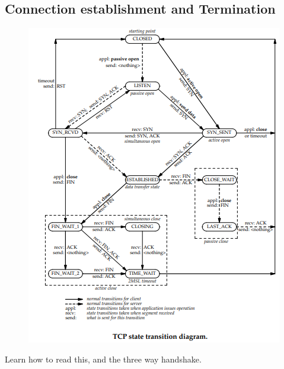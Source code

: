 \documentclass[12pt]{book}
\begin{document}
\subsection{Connection establishment and Termination}
\begin{figure}[H]
    \centering
    \includegraphics[width = \textwidth]{Pictures/TCP.png}
\end{figure}
Learn how to read this, and the three way handshake.
\end{document}
